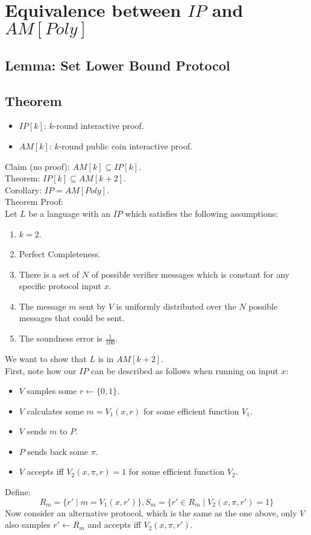 \section*{Equivalence between $IP$ and $AM[Poly]$}
\subsection*{Lemma: Set Lower Bound Protocol}%

\subsection*{Theorem}
\begin{itemize}
    \item $IP[k]$: $k$-round interactive proof.
    \item $AM[k]$: $k$-round public coin interactive proof.
\end{itemize}
Claim (no proof):
$AM[k]\subseteq IP[k]$.\\
Theorem:
$IP[k]\subseteq AM[k+2]$.\\
Corollary: $IP=AM[Poly]$.\\
Theorem Proof:\\
Let $L$ be a language with an $IP$ which satisfies the following assumptions:
\begin{enumerate}
    \item $k=2$.
    \item Perfect Completeness.
    \item There is a set of $N$ of possible verifier messages which is constant for any specific protocol input $x$.
    \item The message $m$ sent by $V$ is uniformly distributed over the $N$ possible messages that could be sent.
    \item The soundness error is $\frac{1}{100}$.
\end{enumerate}
We want to show that $L$ is in $AM[k+2]$.\\
First, note how our $IP$ can be described as follows when running on input $x$:\\
\begin{itemize}
    \item $V$ samples some $r\leftarrow\{0,1\}$.
    \item $V$ calculates some $m=V_1(x,r)$ for some efficient function $V_1$.
    \item $V$ sends $m$ to $P$.
    \item $P$ sends back some $\pi$.
    \item $V$ accepts iff $V_2(x,\pi,r)=1$ for some efficient function $V_2$.
\end{itemize}
Define:
\[R_m=\{r'\mid m=V_1(x,r')\}, S_m=\{r'\in R_m\mid V_2(x,\pi,r')=1\}\]
Now consider an alternative protocol, which is the same as the one above, only $V$ also samples $r'\leftarrow R_m$ and accepts iff $V_2(x,\pi, r')$.

